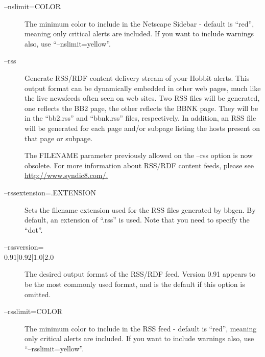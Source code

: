 \begin{description}
 

\item[--nslimit=COLOR] The minimum color to include in the Netscape
  Sidebar - default is ``red'', meaning only critical alerts are
  included. If you want to include warnings also, use
  ``--nslimit=yellow''. 


 

\item[--rss] Generate RSS/RDF content delivery stream of your Hobbit
  alerts. This output format can be dynamically embedded in other web
  pages, much like the live newsfeeds often seen on web sites. Two RSS
  files will be generated, one reflects the BB2 page, the other
  reflects the BBNK page. They will be in the ``bb2.rss'' and
  ``bbnk.rss'' files, respectively. In addition, an RSS file will be
  generated for each page and/or subpage listing the hosts present on
  that page or subpage.  

 The FILENAME parameter previously allowed on the --rss option is now obsolete.  
 For more information about RSS/RDF content feeds, please see \url{http://www.syndic8.com/.}

 

\item[--rssextension=.EXTENSION] Sets the filename extension used for
  the RSS files generated by bbgen. By default, an extension of
  ``.rss'' is used. Note that you need to specify the ``dot''. 


 

\item[--rssversion=\\{0.91|0.92|1.0|2.0\\}] The desired output format of
  the RSS/RDF feed. Version 0.91 appears to be the most commonly used
  format, and is the default if this option is omitted. 


 

\item[--rsslimit=COLOR] The minimum color to include in the RSS feed -
  default is ``red'', meaning only critical alerts are included. If
  you want to include warnings also, use ``--rsslimit=yellow''. 

\end{description}

